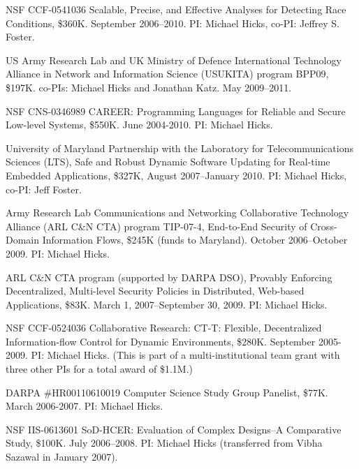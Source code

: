 \documentclass[11pt]{article}
\begin{document}
\begin{description}
\item NSF CCF-0541036 Scalable, Precise, and Effective Analyses for Detecting Race Conditions, \$360K. September 2006--2010. PI: Michael Hicks, co-PI: Jeffrey S. Foster.

\item US Army Research Lab and UK Ministry of Defence International Technology Alliance in Network and Information Science (USUKITA) program BPP09, \$197K. co-PIs: Michael Hicks and Jonathan Katz. May 2009--2011.

\item NSF CNS-0346989 CAREER: Programming Languages for Reliable and Secure Low-level Systems, \$550K. June 2004-2010. PI: Michael Hicks.

\item University of Maryland Partnership with the Laboratory for Telecommunications Sciences (LTS), Safe and Robust Dynamic Software Updating for Real-time Embedded Applications, \$327K, August 2007--January 2010. PI: Michael Hicks, co-PI: Jeff Foster.

\item Army Research Lab Communications and Networking Collaborative Technology Alliance (ARL C\&N CTA) program TIP-07-4, End-to-End Security of Cross-Domain Information Flows, \$245K (funds to Maryland). October 2006--October 2009. PI: Michael Hicks.

\item ARL C\&N CTA program (supported by DARPA DSO), Provably Enforcing Decentralized, Multi-level Security Policies in Distributed, Web-based Applications, \$83K. March 1, 2007--September 30, 2009. PI: Michael Hicks.

\item NSF CCF-0524036 Collaborative Research: CT-T: Flexible, Decentralized Information-flow Control for Dynamic Environments, \$280K. September 2005-2009. PI: Michael Hicks. (This is part of a multi-institutional team grant with three other PIs for a total award of \$1.1M.)

\item DARPA \#HR00110610019 Computer Science Study Group Panelist, \$77K. March 2006-2007. PI: Michael Hicks.

\item NSF IIS-0613601 SoD-HCER: Evaluation of Complex Designs--A Comparative Study, \$100K. July 2006--2008. PI: Michael Hicks (transferred from Vibha Sazawal in January 2007).

\end{description}
\end{document}
